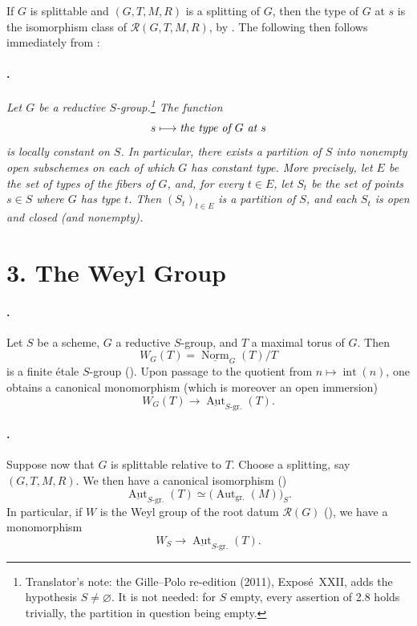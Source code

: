 If \(G\) is splittable and \((G,T,M,R)\) is a splitting of \(G\),
then the type of \(G\) at \(s\) is the isomorphism class of
\(\mathcal R(G,T,M,R)\), by . The following
then follows immediately from :

\paragraph{.}
\textit{Let \(G\) be a reductive \(S\)-group.\footnote{\upshape Translator's note: the Gille--Polo re-edition (2011), Exposé~XXII, adds
the hypothesis \(S\ne\varnothing\). It is not needed: for \(S\) empty, every
assertion of 2.8 holds trivially, the partition in question being empty.} The function}
\[
  s\longmapsto\text{\textit{the type of \(G\) at \(s\)}}
\]
\textit{is locally constant on \(S\). In particular, there exists a
partition of \(S\) into nonempty open subschemes on each of which
\(G\) has constant type. More precisely, let \(E\) be the set of
types of the fibers of \(G\), and, for every \(t\in E\), let \(S_t\)
be the set of points \(s\in S\) where \(G\) has type \(t\). Then
\((S_t)_{t\in E}\) is a partition of \(S\), and each \(S_t\) is open
and closed \textup{(and nonempty)}.}

\section*{3. The Weyl Group}

\paragraph{.}
Let \(S\) be a scheme, \(G\) a reductive \(S\)-group, and \(T\) a
maximal torus of \(G\). Then
\[
  W_G(T)=\underline{\operatorname{Norm}}_G(T)/T
\]
is a finite étale \(S\)-group \textup{()}. Upon
passage to the quotient from \(n\mapsto\operatorname{int}(n)\), one
obtains a canonical monomorphism \textup{(which is moreover an
open immersion)}
\[
  W_G(T)\longrightarrow
  \underline{\operatorname{Aut}}_{S\text{-gr.}}(T).
\]

\paragraph{.}
Suppose now that \(G\) is splittable relative to \(T\). Choose a
splitting, say \((G,T,M,R)\). We then have a canonical isomorphism
\textup{()}
\[
  \underline{\operatorname{Aut}}_{S\text{-gr.}}(T)
  \simeq
  \bigl(\operatorname{Aut}_{\mathrm{gr.}}(M)\bigr)_S.
\]
In particular, if \(W\) is the Weyl group of the root datum
\(\mathcal R(G)\) \textup{()}, we have a
monomorphism
\[
  W_S\longrightarrow
  \underline{\operatorname{Aut}}_{S\text{-gr.}}(T).
\]

